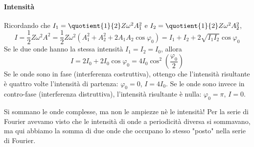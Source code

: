 \paragraph{Intensità}
Ricordando che \(I_1 = \quotient{1}{2} Z \omega ^{2} A_1 ^{2} \) e \(I_2 = \quotient{1}{2} Z \omega ^{2} A_2 ^{2} \),
\[
	I = \frac{1}{2} Z \omega ^{2} A^{2} = \frac{1}{2} Z \omega ^{2} (A_1 ^{2} + A_2 ^{2} + 2 A_1 A_2 \cos \varphi _0 ) = I_1 + I_2 + 2 \sqrt{I_1 I_2} \cos \varphi _0
\]
Se le due onde hanno la stessa intensità \(I_1 = I_2 = I_0 \), allora 
\[
	I = 2 I_0 + 2 I_0 \cos \varphi _0 = 4 I_0 \cos ^{2} \left( \frac{\varphi _0}{2} \right)
\]
Se le onde sono in fase (interferenza costruttiva), ottengo che l'intensità risultante è quattro volte l'intensità di partenza: \(\varphi _0 = 0\), \(I= 4 I_0\). Se le onde sono invece in contro-fase (interferenza distruttiva), l'intensità risultante è nulla: \(\varphi _0 = \pi \), \(I = 0\).
\begin{note}
	Si sommano le onde complesse, ma non le ampiezze nè le intensità! Per la serie di Fourier avevamo visto che le intensità di onde a periodicità diversa si sommavano, ma qui abbiamo la somma di due onde che occupano lo stesso "posto" nella serie di Fourier.
\end{note}


